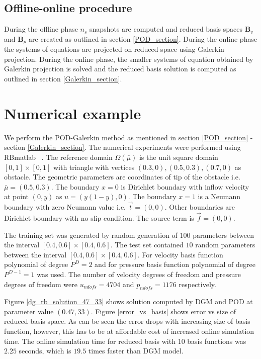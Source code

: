 \documentclass[graybox]{svmult}
\begin{document}
\subsection{Offline-online procedure}

During the offline phase $n_s$ snapshots are computed and reduced basis spaces $\bm{B}_v$ and $\bm{B}_p$ are created as outlined in section \ref{POD_section}. During the online phase the systems of equations are projected on reduced space using Galerkin projection. During the online phase, the smaller systems of equation obtained by Galerkin projection is solved and the reduced basis solution is computed as outlined in section \ref{Galerkin_section}. 

\section{Numerical example}

We perform the POD-Galerkin method as mentioned in section \ref{POD_section} - section \ref{Galerkin_section}. The numerical experiments were performed using RBmatlab ~\cite{rbmatlab}. The reference domain $\Omega({\bar{\mu}})$ is the unit square domain $[0,1] \times [0,1]$ with triangle with vertices $(0.3,0),(0.5,0.3),(0.7,0)$ as obstacle. The geometric parameters are coordinates of tip of the obstacle i.e. $\bar{\mu} = (0.5,0.3)$. The boundary ${x=0}$ is Dirichlet boundary with inflow velocity at point $(0,y)$ as $u = (y(1-y), 0)$. The boundary ${x = 1}$ is a Neumann boundary with zero Neumann value i.e. $\overrightarrow{t} = (0, 0)$. Other boundaries are Dirichlet boundary with no slip condition. The source term is $\overrightarrow{f} = (0,0)$.

The training set was generated by random generation of $100$ parameters between the interval $[0.4,0.6] \times [0.4,0.6]$. The test set contained $10$ random parameters between the interval $[0.4,0.6] \times [0.4,0.6]$. For velocity basis function polynomial of degree $P^D = 2$ and for pressure basis function polynomial of degree $P^{D-1} = 1$ was used. The number of velocity degrees of freedom and pressure degrees of freedom were $u_{ndofs} = 4704$ and $p_{ndofs} = 1176$ respectively.

Figure \ref{dg_rb_solution_47_33} shows solution computed by DGM and POD at parameter value $(0.47,33)$. Figure \ref{error_vs_basis} shows error vs size of reduced basis space. As can be seen the error drops with increasing size of basis function, however, this has to be at affordable cost of increased online simulation time. The online simulation time for reduced basis with 10 basis functions was $2.25$ seconds, which is $19.5$ times faster than DGM model.
\end{document}
